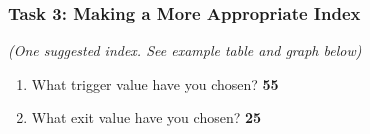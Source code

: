 \documentclass[letterpaper,10pt,english]{sphinxmanual}
\begin{document}
{\hfill}

{\hfill}


\subsubsection{Task 3: Making a More Appropriate Index}
\label{wiiet/wiiet_usingfarmerinformationanskey:task-3-making-a-more-appropriate-index}
\emph{(One suggested index. See example table and graph below)}
\begin{enumerate}
\item {} 
What trigger value have you chosen? \textbf{55}

\item {} 
What exit value have you chosen? \textbf{25}

\end{enumerate}

{\hfill}
\end{document}
